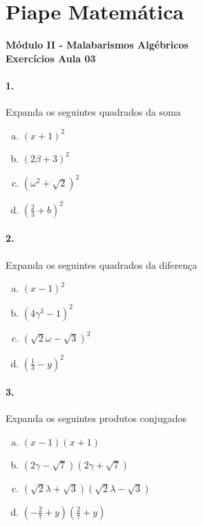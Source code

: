 \documentclass[a4paper,12pt]{article}
\begin{document}
 
  
\section*{Piape Matemática} 
\textbf{Módulo II - Malabarismos Algébricos}\\
\textbf{Exercícios Aula 03}         
\begin{multicols}{2}
\paragraph{1.} Expanda os seguintes quadrados da soma
\begin{enumerate}[a)]
\item $(x + 1)^2$
\item $(2\beta + 3)^2$
\item $(\omega^2 + \sqrt{2})^2$
\item $\displaystyle\left(\frac{2}{3} + b\right)^2$
\end{enumerate} 

\paragraph{2.} Expanda os seguintes quadrados da diferença
\begin{enumerate}[a)]
\item $(x - 1)^2$
\item $(4\gamma^3 - 1)^2$
\item $(\sqrt{2}\omega - \sqrt{3})^2$
\item $\displaystyle\left(\frac{1}{3} - y\right)^2$
\end{enumerate} 

\paragraph{3.} Expanda os seguintes produtos conjugados
\begin{enumerate}[a)]
\item $(x - 1)(x + 1)$
\item $\left(2\gamma - \sqrt{7}\right)\left(2\gamma + \sqrt{7}\right)$
\item $\left(\sqrt{2}\lambda + \sqrt{3}\right)\left(\sqrt{2}\lambda - \sqrt{3}\right)$
\item $\displaystyle\left(-\frac{2}{7} + y\right)\left(\frac{2}{7} + y\right)$
\end{enumerate}  

\end{multicols}
\end{document}
